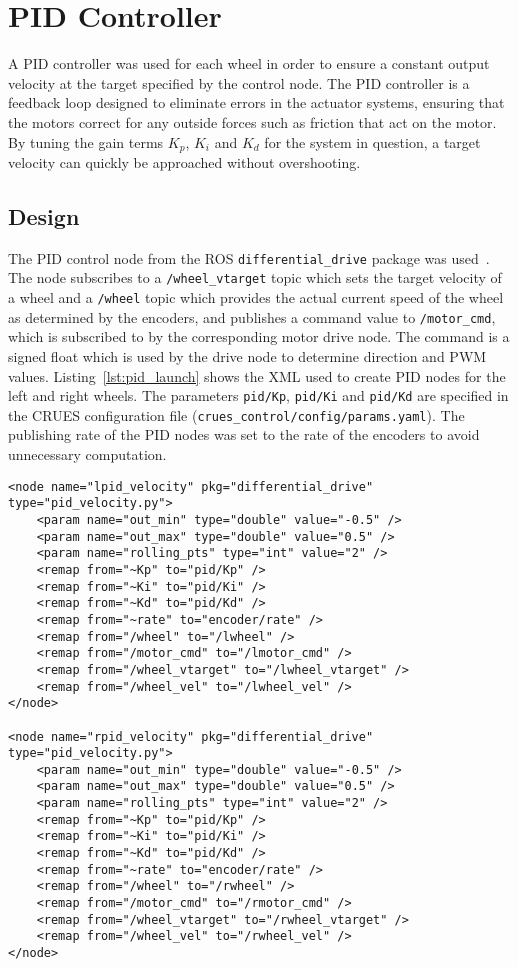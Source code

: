 \section{PID Controller}\label{soft/PID}
A PID controller was used for each wheel in order to ensure a constant output
velocity at the target specified by the control node. The PID controller is
a feedback loop designed to eliminate errors in the actuator systems, ensuring
that the motors correct for any outside forces such as friction that act on the
motor. By tuning the gain terms $K_p$, $K_i$ and $K_d$ for the system in
question, a target velocity can quickly be approached without overshooting.

\subsection{Design}\label{soft/PID/design}
The PID control node from the ROS \verb|differential_drive| package was
used~\cite{diffdrivelib}. The node subscribes to a \verb|/wheel_vtarget| topic
which sets the target velocity of a wheel and a \verb|/wheel| topic which provides
the actual current speed of the wheel as determined by the encoders, and publishes
a command value to \verb|/motor_cmd|, which is subscribed to by the corresponding
motor drive node. The command is a signed float which is used by the drive node
to determine direction and PWM values. Listing~\ref{lst:pid_launch} shows the
XML used to create PID nodes for the left and right wheels. The parameters
\verb|pid/Kp|, \verb|pid/Ki| and \verb|pid/Kd| are specified in the CRUES
configuration file (\verb|crues_control/config/params.yaml|). The publishing rate
of the PID nodes was set to the rate of the encoders to avoid unnecessary
computation.

\begin{lstlisting}[caption={PID nodes in ROS launch file}, label={lst:pid_launch}, style=xml]
<node name="lpid_velocity" pkg="differential_drive" type="pid_velocity.py">
    <param name="out_min" type="double" value="-0.5" />
    <param name="out_max" type="double" value="0.5" />
    <param name="rolling_pts" type="int" value="2" />
    <remap from="~Kp" to="pid/Kp" />
    <remap from="~Ki" to="pid/Ki" />
    <remap from="~Kd" to="pid/Kd" />
    <remap from="~rate" to="encoder/rate" />
    <remap from="/wheel" to="/lwheel" />
    <remap from="/motor_cmd" to="/lmotor_cmd" />
    <remap from="/wheel_vtarget" to="/lwheel_vtarget" />
    <remap from="/wheel_vel" to="/lwheel_vel" />
</node>

<node name="rpid_velocity" pkg="differential_drive" type="pid_velocity.py">
    <param name="out_min" type="double" value="-0.5" />
    <param name="out_max" type="double" value="0.5" />
    <param name="rolling_pts" type="int" value="2" />
    <remap from="~Kp" to="pid/Kp" />
    <remap from="~Ki" to="pid/Ki" />
    <remap from="~Kd" to="pid/Kd" />
    <remap from="~rate" to="encoder/rate" />
    <remap from="/wheel" to="/rwheel" />
    <remap from="/motor_cmd" to="/rmotor_cmd" />
    <remap from="/wheel_vtarget" to="/rwheel_vtarget" />
    <remap from="/wheel_vel" to="/rwheel_vel" />
</node>
\end{lstlisting}

